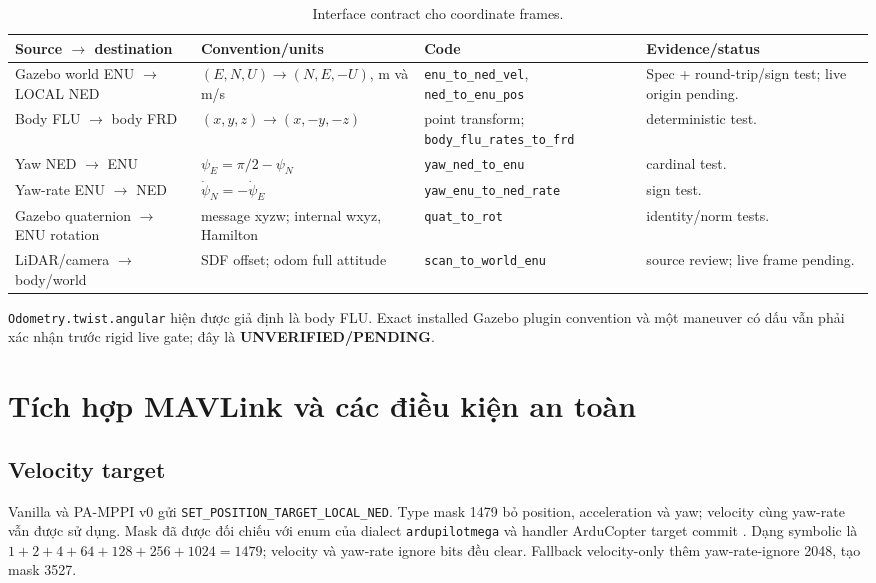 \documentclass[11pt,a4paper]{article}
\newcommand{\code}[1]{\texttt{#1}}
\begin{document}
\begin{table}[ht]
\centering\footnotesize
\caption{Interface contract cho coordinate frames.}
\begin{tabularx}{\textwidth}{L{0.20\textwidth}L{0.19\textwidth}L{0.23\textwidth}Y}
\toprule
\textbf{Source $\to$ destination} & \textbf{Convention/units} & \textbf{Code} & \textbf{Evidence/status}\\
\midrule
Gazebo world ENU $\to$ LOCAL NED & $(E,N,U)\to(N,E,-U)$, m và m/s & \code{enu\_to\_ned\_vel}, \code{ned\_to\_enu\_pos} & Spec + round-trip/sign test; live origin pending.\\
Body FLU $\to$ body FRD & $(x,y,z)\to(x,-y,-z)$ & point transform; \code{body\_flu\_rates\_to\_frd} & deterministic test.\\
Yaw NED $\to$ ENU & $\psi_E=\pi/2-\psi_N$ & \code{yaw\_ned\_to\_enu} & cardinal test.\\
Yaw-rate ENU $\to$ NED & $\dot\psi_N=-\dot\psi_E$ & \code{yaw\_enu\_to\_ned\_rate} & sign test.\\
Gazebo quaternion $\to$ ENU rotation & message xyzw; internal wxyz, Hamilton & \code{quat\_to\_rot} & identity/norm tests.\\
LiDAR/camera $\to$ body/world & SDF offset; odom full attitude & \code{scan\_to\_world\_enu} & source review; live frame pending.\\
\bottomrule
\end{tabularx}
\end{table}

\code{Odometry.twist.angular} hiện được giả định là body FLU. Exact installed
Gazebo plugin convention và một maneuver có dấu vẫn phải xác nhận trước rigid
live gate; đây là \textbf{UNVERIFIED/PENDING}.

\section{Tích hợp MAVLink và các điều kiện an toàn}

\subsection{Velocity target}

Vanilla và PA-MPPI v0 gửi \code{SET\_POSITION\_TARGET\_LOCAL\_NED}. Type mask
1479 bỏ position, acceleration và yaw; velocity cùng yaw-rate vẫn được sử dụng.
Mask đã được đối chiếu với enum của dialect \code{ardupilotmega} và handler
ArduCopter target commit \cite{mavlinkCommon2026,ardupilotSourceF808}. Dạng
symbolic là $1+2+4+64+128+256+1024=1479$; velocity và yaw-rate ignore bits đều
clear. Fallback velocity-only thêm yaw-rate-ignore 2048, tạo mask 3527.
\end{document}
